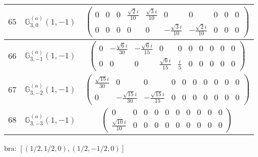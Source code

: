 \documentclass[fleqn,8pt,landscape]{jsarticle}
\begin{document}
\begin{center}
\begin{longtable}{ccc}
$ 65 $ & $ \mathbb{G}_{3,0}^{(a)}(1,-1) $ & $ \begin{pmatrix} 0 & 0 & 0 & \frac{\sqrt{2} i}{10} & \frac{\sqrt{3} i}{10} & 0 & 0 & 0 & 0 & 0 \\ 0 & 0 & 0 & 0 & 0 & - \frac{\sqrt{3} i}{10} & - \frac{\sqrt{2} i}{10} & 0 & 0 & 0 \end{pmatrix} $ \\ \hline
$ 66 $ & $ \mathbb{G}_{3,-1}^{(a)}(1,-1) $ & $ \begin{pmatrix} 0 & - \frac{\sqrt{6} i}{30} & - \frac{\sqrt{6} i}{15} & 0 & 0 & 0 & 0 & 0 & 0 & 0 \\ 0 & 0 & 0 & \frac{\sqrt{6} i}{15} & \frac{i}{5} & 0 & 0 & 0 & 0 & 0 \end{pmatrix} $ \\ \hline
$ 67 $ & $ \mathbb{G}_{3,-2}^{(a)}(1,-1) $ & $ \begin{pmatrix} \frac{\sqrt{15} i}{30} & 0 & 0 & 0 & 0 & 0 & 0 & 0 & 0 & 0 \\ 0 & - \frac{\sqrt{15} i}{30} & - \frac{\sqrt{15} i}{15} & 0 & 0 & 0 & 0 & 0 & 0 & 0 \end{pmatrix} $ \\ \hline
$ 68 $ & $ \mathbb{G}_{3,-3}^{(a)}(1,-1) $ & $ \begin{pmatrix} 0 & 0 & 0 & 0 & 0 & 0 & 0 & 0 & 0 & 0 \\ \frac{\sqrt{10} i}{10} & 0 & 0 & 0 & 0 & 0 & 0 & 0 & 0 & 0 \end{pmatrix} $ \\
\end{longtable}
\end{center}
bra: $[(1/2,1/2,0),(1/2,-1/2,0)]$
\end{document}
